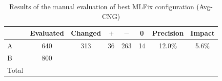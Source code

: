 \begin{table}[t]
\centering
\small
{}
\caption{
	Final evaluation of Englsh-German configuration of MLFix. Majority-CNG and Avg-CNG methods were compared
with the best English-Czech configuration.
}
\label{final_de-summary}
\end{table}

\begin{table}[t]
\centering
\small
{}
\caption{
    Number of sentences changed by different systems. Total number of
sentences in each dataset () is also listed.
}   
\label{final_de-chgd}
\end{table}



\begin{table}[t]
\centering
\small

\begin{tabular}{l|cc|ccc|cc}
  &  Evaluated  &  Changed  &  $+$  &  $-$  &  0  &  Precision  &  Impact  \\
\hline
A  &  640  &  313  &  36  &  263  &  14  &  12.0\%  &  5.6\%  \\
B  &  800  &    &    &    &    &    &    \\
\hline
Total & & & & & & & \\
\end{tabular}
\caption{
Results of the manual evaluation of best MLFix configuration (Avg-CNG)
}
\label{maneval-final}
\end{table}
 
